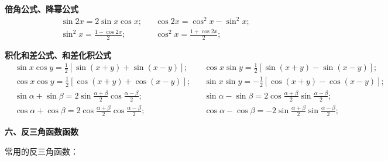 \textbf{倍角公式、降幂公式}
\begin{align*}
	& \sin 2x = 2 \sin x \cos x; & &\cos 2x = \cos^2 x - \sin^2 x;  \\
	&  \sin^2 x = \frac{1-\cos 2x}{2} ; & & \cos^2 x = \frac{1+\cos 2x}{2};
\end{align*}

 \textbf{积化和差公式、和差化积公式}
\begin{align*}
	& \sin x \cos y = \frac{1}{2}[\sin (x+y)+\sin (x-y)]; & 
	& \cos x \sin y = \frac{1}{2}[\sin (x+y)-\sin (x-y)]; \\
	& \cos x \cos y = \frac{1}{2}[\cos (x+y)+\cos (x-y)]; & 
	& \sin x \sin y = -\frac{1}{2}[\cos (x+y)-\cos (x-y)]; \\[1.5ex]
	& \sin \alpha+\sin \beta = 2 \sin \frac{\alpha+\beta}{2} \cos \frac{\alpha-\beta}{2}; & 
	& \sin \alpha-\sin \beta = 2 \cos \frac{\alpha+\beta}{2} \sin \frac{\alpha-\beta}{2}; \\
	& \cos \alpha+\cos \beta = 2 \cos \frac{\alpha+\beta}{2} \cos \frac{\alpha-\beta}{2}; & 
	& \cos \alpha-\cos \beta = -2 \sin \frac{\alpha+\beta}{2} \sin \frac{\alpha-\beta}{2};
\end{align*}

\vspace{0.5cm}
\textbf{六、反三角函数函数}


常用的反三角函数：


